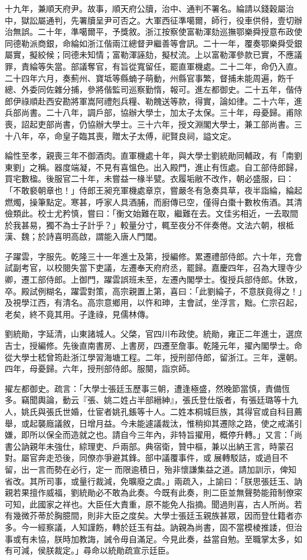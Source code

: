 \begin{pinyinscope}
十九年，兼順天府尹。故事，順天府公牘，治中、通判不署名。綸請以錢穀屬治中，獄訟屬通判，先署牘呈尹可否之。大軍西征準噶爾，師行，役車供偫，壹切辦治無誤。二十年，準噶爾平，予獎敘。浙江按察使富勒渾劾巡撫鄂樂舜授意布政使同德勒派商銀，命綸如浙江偕兩江總督尹繼善等會訊。二十一年，覆奏鄂樂舜受銀屬實，擬絞候；同德未知情；富勒渾誣劾，擬杖流。上以富勒渾參款已實，不應議罪，責綸等失當。部議奪官，有旨從寬留任，罷直軍機處。二十二年，命仍入直。二十四年六月，奏薊州、寶坻等縣蝻子萌動，州縣官事繁，督捕未能周遍，飭千總、外委同佐雜分捕，參將偕監司巡察勤惰，報可。進左都御史。二十五年，偕侍郎伊祿順赴西安勘將軍嵩阿禮剋兵糧、勒餽送等款，得實，論如律。二十六年，進兵部尚書。二十八年，調戶部，協辦大學士，加太子太保。三十年，母憂歸。甫除喪，詔起吏部尚書，仍協辦大學士。三十六年，授文淵閣大學士，兼工部尚書。三十八年，卒，命皇子臨其喪，贈太子太傅，祀賢良祠，謚文定。

綸性至孝，親喪三年不御酒肉。直軍機處十年，與大學士劉統勛同輔政，有「南劉東劉」之稱。器度端凝，不見有喜慍色。出入殿門，進止有恆處。自工部侍郎歸，買宅數楹。後服官二十年，未嘗益一椽半甓。衣履垢敝不改作，朝必盛服，曰：「不敢褻朝章也！」侍郎王昶充軍機處章京，嘗嚴冬有急奏具草，夜半詣綸，綸起燃燭，操筆點定。寒甚，呼家人具酒脯，而廚傳已空，僅得白棗十數枚侑酒。其清儉類此。校士尤矜慎，嘗曰：「衡文始難在取，繼難在去。文佳劣相近，一去取間於我甚易，獨不為士子計乎？」較量分寸，輒至夜分不伴奏倦。文法六朝，根柢漢、魏；於詩喜明高啟，謂能入唐人門閾。

子躍雲，字服先。乾隆三十一年進士及第，授編修。累遷禮部侍郎。六十年，充會試副考官，以校閱失當下吏議，左遷奉天府府丞，罷歸。嘉慶四年，召為大理寺少卿，遷工部侍郎。上御門，躍雲誤班未至，左遷內閣學士。復授兵部侍郎。休致，卒。殿試例糊名，躍雲對策，高宗親置上第，喜曰：「此劉綸子，不意朕竟得之！」及視學江西，有清名。高宗意鄉用，以忤和珅，主會試，坐浮言，黜。仁宗召起，老矣，終不竟其用。子逢祿，見儒林傳。

劉統勛，字延清，山東諸城人。父棨，官四川布政使。統勛，雍正二年進士，選庶吉士，授編修。先後直南書房、上書房，四遷至詹事。乾隆元年，擢內閣學士。命從大學士嵇曾筠赴浙江學習海塘工程。二年，授刑部侍郎，留浙江。三年，還朝。四年，母憂歸。六年，授刑部侍郎。服闋，詣京師。

擢左都御史。疏言：「大學士張廷玉歷事三朝，遭逢極盛，然晚節當慎，責備恆多。竊聞輿論，動云『張、姚二姓占半部縉紳』，張氏登仕版者，有張廷璐等十九人，姚氏與張氏世婚，仕宦者姚孔鋹等十人。二姓本桐城巨族，其得官或自科目薦舉，或起襲廕議敘，日增月益。今未能遽議裁汰，惟稍抑其遷除之路，使之戒滿引嫌，即所以保全而造就之也。請自今三年內，非特旨擢用，概停升轉。」又言：「尚書公訥親年未強仕，綜理吏、戶兩部。典宿衛，贊中樞，兼以出納王言，時蒙召對。屬官奔走恐後，同僚亦爭避其鋒。部中議覆事件，或展轉駁詰，或過目不留，出一言而勢在必行，定一而限逾積日，殆非懷謙集益之道。請加訓示，俾知省改。其所司事，或量行裁減，免曠廢之虞。」兩疏入，上諭曰：「朕思張廷玉、訥親若果擅作威福，劉統勛必不敢為此奏。今既有此奏，則二臣並無聲勢能箝制僚寀可知，此國家之祥也。大臣任大責重，原不能免人指摘。聞過則喜，古人所尚。若有幾微芥蒂於胸臆間，則非大臣之度矣。大學士張廷玉親族甚眾，因而登仕籍者亦多。今一經察議，人知謹飭，轉於廷玉有益。訥親為尚書，固不當模棱推諉，但治事或有未協，朕時加教誨，誡令毋自滿足。今見此奏，益當自勉。至職掌太多，如有可減，侯朕裁定。」尋命以統勛疏宣示廷臣。


\end{pinyinscope}
